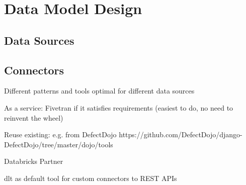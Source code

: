 \chapter{Data Model Design}
\label{ch:model}







\section{Data Sources}

\section{Connectors}

Different patterns and tools optimal for different data sources

As a service: Fivetran if it satisfies requirements (easiest to do, no need to reinvent the wheel)

Reuse existing: e.g. from DefectDojo https://github.com/DefectDojo/django-DefectDojo/tree/master/dojo/tools

Databricks Partner

dlt as default tool for custom connectors to REST APIs

